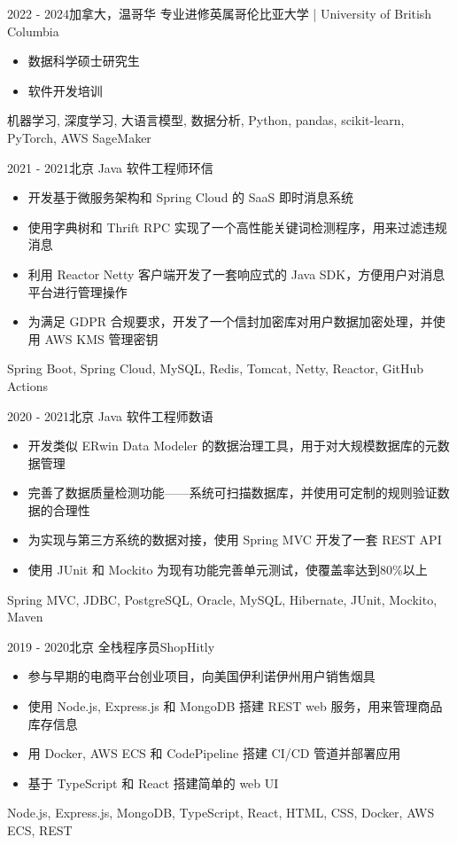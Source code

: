 \begin{experiences}

\experience
{2022 - 2024}{加拿大，温哥华}
{专业进修}{英属哥伦比亚大学 | University of British Columbia}
{
    \begin{itemize}
    \item 数据科学硕士研究生
    \item 软件开发培训
    \end{itemize}
}
{机器学习, 深度学习, 大语言模型, 数据分析, Python, pandas, scikit-learn, PyTorch, AWS SageMaker}

\experience
{2021 - 2021}{北京}
{Java 软件工程师}{环信}
{
    \begin{itemize}
    \item 开发基于微服务架构和 Spring Cloud 的 SaaS 即时消息系统
    \item 使用字典树和 Thrift RPC 实现了一个高性能关键词检测程序，用来过滤违规消息
    \item 利用 Reactor Netty 客户端开发了一套响应式的 Java SDK，方便用户对消息平台进行管理操作
    \item 为满足 GDPR 合规要求，开发了一个信封加密库对用户数据加密处理，并使用 AWS KMS 管理密钥
    \end{itemize}
}
{Spring Boot, Spring Cloud, MySQL, Redis, Tomcat, Netty, Reactor, GitHub Actions}

\experience
{2020 - 2021}{北京}
{Java 软件工程师}{数语}
{
    \begin{itemize}
    \item 开发类似 ERwin Data Modeler 的数据治理工具，用于对大规模数据库的元数据管理
    \item 完善了数据质量检测功能——系统可扫描数据库，并使用可定制的规则验证数据的合理性
    \item 为实现与第三方系统的数据对接，使用 Spring MVC 开发了一套 REST API
    \item 使用 JUnit 和 Mockito 为现有功能完善单元测试，使覆盖率达到80\%以上
    \end{itemize}
}
{Spring MVC, JDBC, PostgreSQL, Oracle, MySQL, Hibernate, JUnit, Mockito, Maven}

\experience
{2019 - 2020}{北京}
{全栈程序员}{ShopHitly}
{
    \begin{itemize}
    \item 参与早期的电商平台创业项目，向美国伊利诺伊州用户销售烟具
    \item 使用 Node.js, Express.js 和 MongoDB 搭建 REST web 服务，用来管理商品库存信息
    \item 用 Docker, AWS ECS 和 CodePipeline 搭建 CI/CD 管道并部署应用
    \item 基于 TypeScript 和 React 搭建简单的 web UI
    \end{itemize}
}
{Node.js, Express.js, MongoDB, TypeScript, React, HTML, CSS, Docker, AWS ECS, REST}


\end{experiences}
